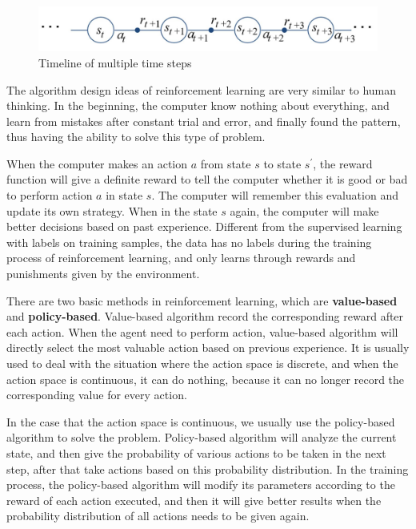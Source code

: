 \begin{figure}[h]
    \centering
    \includegraphics[width=\linewidth]{../Figures/timeline_RL.JPG}
    \caption{Timeline of multiple time steps}
\end{figure}

The algorithm design ideas of reinforcement learning are very similar to human thinking. In the beginning, the computer know nothing about everything, and learn from mistakes after constant trial and error, and finally found the pattern, thus having the ability to solve this type of problem. 

When the computer makes an action $a$ from state $s$ to state $s^{'}$, the reward function will give a definite reward to tell the computer whether it is good or bad to perform action $a$ in state $s$. The computer will remember this evaluation and update its own strategy. When in the state $s$ again, the computer will make better decisions based on past experience. Different from the supervised learning with labels on training samples, the data has no labels during the training process of reinforcement learning, and only learns through rewards and punishments given by the environment.

There are two basic methods in reinforcement learning, which are \textbf{value-based} and \textbf{policy-based}. Value-based algorithm record the corresponding reward after each action. When the agent need to perform action, value-based algorithm will directly select the most valuable action based on previous experience. It is usually used to deal with the situation where the action space is discrete, and when the action space is continuous, it can do nothing, because it can no longer record the corresponding value for every action.

In the case that the action space is continuous, we usually use the policy-based algorithm to solve the problem. Policy-based algorithm will analyze the current state, and then give the probability of various actions to be taken in the next step, after that take actions based on this probability distribution. In the training process, the policy-based algorithm will modify its parameters according to the reward of each action executed, and then it will give better results when the probability distribution of all actions needs to be given again.

